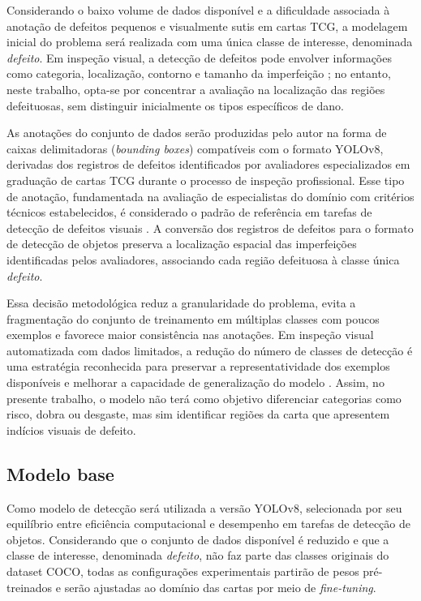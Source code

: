 \documentclass[
    12pt,                %
    openright,           %
    oneside,             %
    a4paper,             %
    english,             %
    brazil               %
]{abntex2}
\begin{document}
Considerando o baixo volume de dados disponível e a dificuldade 
associada à anotação de defeitos pequenos e visualmente sutis em cartas TCG,
a modelagem inicial do problema será realizada com uma única classe de interesse,
denominada \textit{defeito}. Em inspeção visual, a detecção de defeitos pode 
envolver informações como categoria, localização, contorno e tamanho da imperfeição
\cite{Chen2021}; no entanto, neste trabalho, opta-se por concentrar a avaliação 
na localização das regiões defeituosas, sem distinguir inicialmente os tipos 
específicos de dano.

As anotações do conjunto de dados serão produzidas pelo autor 
na forma de caixas delimitadoras (\textit{bounding boxes}) 
compatíveis com o formato YOLOv8, derivadas dos registros de 
defeitos identificados por avaliadores especializados em 
graduação de cartas TCG durante o processo de inspeção 
profissional. Esse tipo de anotação, fundamentada na avaliação 
de especialistas do domínio com critérios técnicos estabelecidos, 
é considerado o padrão de referência em tarefas de detecção de 
defeitos visuais \cite{Nahar2025}. A conversão dos registros 
de defeitos para o formato de detecção de objetos preserva a 
localização espacial das imperfeições identificadas pelos 
avaliadores, associando cada região defeituosa à classe única 
\textit{defeito}.

Essa decisão metodológica reduz a granularidade do problema, evita a 
fragmentação do conjunto de treinamento em múltiplas classes com poucos 
exemplos e favorece maior consistência nas anotações. Em inspeção visual 
automatizada com dados limitados, a redução do número de classes de 
detecção é uma estratégia reconhecida para preservar a representatividade 
dos exemplos disponíveis e melhorar a capacidade de generalização do 
modelo \cite{Chen2021}. Assim, no presente trabalho, o modelo não terá 
como objetivo diferenciar categorias como risco, dobra ou desgaste, 
mas sim identificar regiões da carta que apresentem indícios visuais 
de defeito.

\subsection{Modelo base}
\label{subsec:modelo_base}

Como modelo de detecção será utilizada a versão YOLOv8, selecionada por seu
equilíbrio entre eficiência computacional e desempenho em tarefas de detecção
de objetos. Considerando que o conjunto de dados disponível é reduzido e que
a classe de interesse, denominada \textit{defeito}, não faz parte das classes
originais do dataset COCO, todas as configurações experimentais partirão de
pesos pré-treinados e serão ajustadas ao domínio das cartas por meio de
\textit{fine-tuning}.
\end{document}

